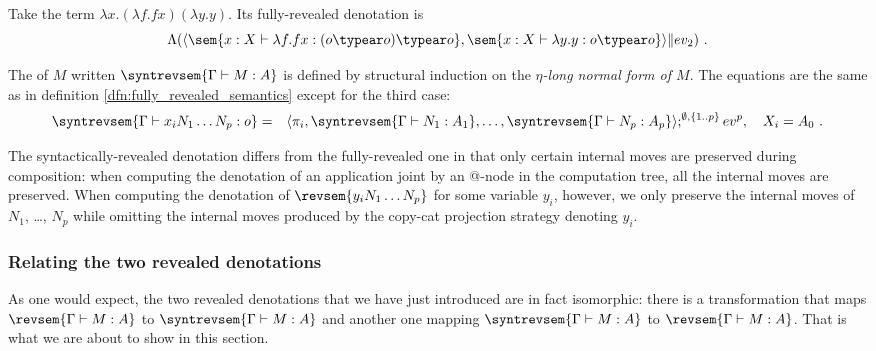 \begin{example}
Take the term $\lambda x . (\lambda f . f x) (\lambda y . y)$.
Its fully-revealed denotation is $$\Lambda ( \langle \sem{ x:X \vdash \lambda f . f
x : (o\typear o) \typear o} , \sem{ x:X \vdash \lambda y . y
: o \typear o} \rangle \| ev_2 ) \ .$$
\end{example}


\begin{definition}
\label{dfn:syntactic_revealed_semantics} The  of $M$ written $\syntrevsem{\Gamma \vdash M : A}$ is defined by structural induction on the \emph{$\eta$-long normal form of $M$}. The equations are the same as in definition \ref{dfn:fully_revealed_semantics} except for the third case:
\begin{eqnarray*}
\syntrevsem{\Gamma  \vdash x_i N_1 \ldots N_p :o} &=& \langle \pi_i, \syntrevsem{\Gamma \vdash N_1 : A_1}, \ldots, \syntrevsem{\Gamma \vdash N_p : A_p}  \rangle ; ^{\emptyset,\{1..p\}} ev^p, \quad X_i = A_0 \ .
\end{eqnarray*}
\end{definition}

The syntactically-revealed denotation differs from the fully-revealed one in that only certain internal moves are preserved during composition: when computing the denotation of an application joint by an @-node in the computation tree, all the internal moves are preserved.
When computing the denotation of
$\revsem{y_i N_1 \ldots N_p}$ for some variable $y_i$, however, we only preserve the internal moves of
$N_1$, \ldots, $N_p$ while omitting the internal moves produced by the copy-cat projection strategy denoting $y_i$.


\subsubsection{Relating the two revealed denotations}
    \label{subsub:defdelta}

    As one would expect, the two revealed denotations that we have just introduced are in fact isomorphic: there is a transformation that maps $\revsem{\Gamma \vdash M : A}$ to $\syntrevsem{\Gamma \vdash M : A}$ and another one mapping $\syntrevsem{\Gamma \vdash M : A}$ to $\revsem{\Gamma \vdash M : A}$. That is what we are about to show in this section.

